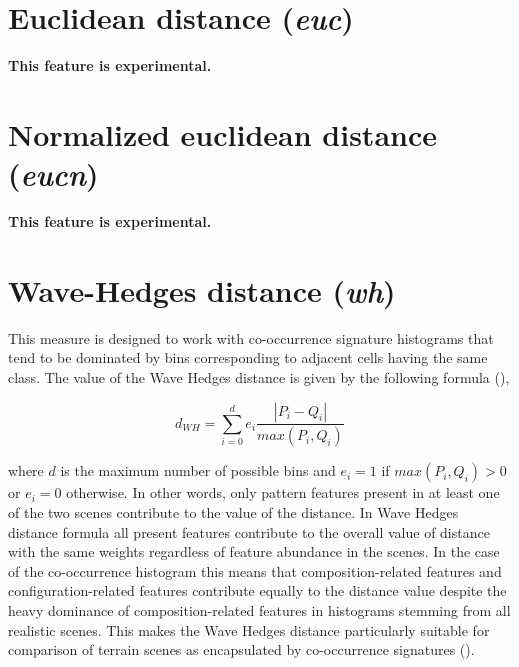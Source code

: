 \section{Euclidean distance ({\it euc})}
\textbf{This feature is experimental.}


\section{Normalized euclidean distance ({\it eucn})}
\textbf{This feature is experimental.}


\section{Wave-Hedges distance ({\it wh})}

This measure is designed to work with co-occurrence signature histograms that tend to be dominated by bins corresponding to adjacent cells having the same class. 
The value of the Wave Hedges distance is given by the following formula (\cite{Cha2007}),

\begingroup
\begin{equation} \label{eq:wave_hedges}
d_{WH}=\sum\limits_{i=0}^{d}{
 e_i\dfrac{ |P_{i} - Q_{i}|}{max(P_{i},Q_{i})}}
\end{equation}
\endgroup

\noindent where $d$ is the maximum number of possible bins and $e_i = 1$ if $max(P_{i},Q_{i})>0$ or $e_i = 0$ otherwise.
In other words, only pattern features present in at least one of the two scenes contribute to the value of the distance. 
In Wave Hedges distance formula all present features contribute to the overall value of distance with the same weights regardless of feature abundance in the scenes. 
In the case of the co-occurrence histogram this means that composition-related features and configuration-related features contribute equally to the distance value despite the heavy dominance of composition-related features in histograms stemming from all realistic scenes. 
This makes the Wave Hedges distance particularly suitable for comparison of terrain scenes as encapsulated by co-occurrence signatures (\cite{Jasiewicz2014GMRH}).

